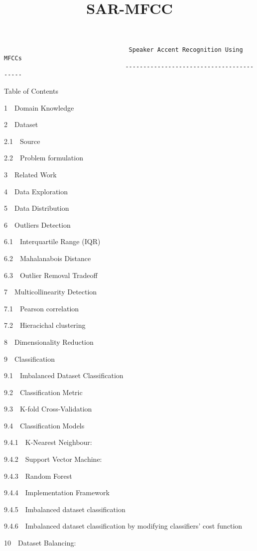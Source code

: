 \documentclass[11pt]{article}
\title{SAR-MFCC}
\begin{document}
    
    \maketitle
    
    

    
    \begin{verbatim}
                                   Speaker Accent Recognition Using MFCCs
                                  -----------------------------------------
\end{verbatim}

    Table of Contents{}

{{1~~}Domain Knowledge}

{{2~~}Dataset}

{{2.1~~}Source}

{{2.2~~}Problem formulation}

{{3~~}Related Work}

{{4~~}Data Exploration}

{{5~~}Data Distribution}

{{6~~}Outliers Detection}

{{6.1~~}Interquartile Range (IQR)}

{{6.2~~}Mahalanabois Distance}

{{6.3~~}Outlier Removal Tradeoff}

{{7~~}Multicollinearity Detection}

{{7.1~~}Pearson correlation}

{{7.2~~}Hieracichal clustering}

{{8~~}Dimensionality Reduction}

{{9~~}Classification}

{{9.1~~}Imbalanced Dataset Classification}

{{9.2~~}Classification Metric}

{{9.3~~}K-fold Cross-Validation}

{{9.4~~}Classification Models}

{{9.4.1~~}K-Nearest Neighbour:}

{{9.4.2~~}Support Vector Machine:}

{{9.4.3~~}Random Forest}

{{9.4.4~~}Implementation Framework}

{{9.4.5~~}Imbalanced dataset classification}

{{9.4.6~~}Imbalanced dataset classification by modifying classifiers'
cost function}

{{10~~}Dataset Balancing:}
\end{document}
